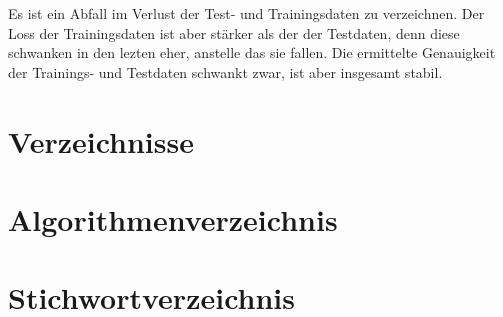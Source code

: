 \documentclass[13pt,a4paper, listof=entryprefix, bibliography=totocnumbered,toc=listofnumbered,lof=listofnumbered]{scrartcl}
\newcounter{verzeichnis}
\begin{document}
	Es ist ein Abfall im Verlust der Test- und Trainingsdaten zu verzeichnen. Der Loss der Trainingsdaten ist aber stärker als der der 
	Testdaten, denn diese schwanken in den lezten eher, anstelle das sie fallen. Die ermittelte Genauigkeit der Trainings- und Testdaten 
	schwankt zwar, ist aber insgesamt stabil. 
	

		\pagebreak

		 \label{Verzeichnisse}
		\renewcommand{\thesection}{\Roman{verzeichnis}}
		\section*{Verzeichnisse} 
   		 \label{Literaturverzeichnis}
		\renewcommand{\refname}{Literaturverzeichnis}
		\printbibliography
		\pagebreak

		\listoffigures
		\pagebreak


		\listoftables
		\pagebreak

        \lstlistoflistings
        \pagebreak


        \section{Algorithmenverzeichnis}
        \vspace{-2em}



\pagebreak
{}
\section{Stichwortverzeichnis}
\end{document}
